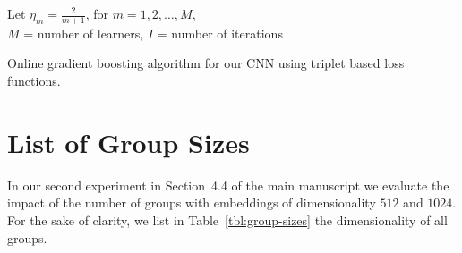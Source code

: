 \documentclass[10pt,journal,compsoc]{IEEEtran}
\begin{document}
\setlength{\algomargin}{0.0cm}\begin{algorithm}[htbp]
    Let $\eta_m = \frac{2}{m+1}$,  for $m = 1,2,\ldots,M$, \\
    $M$ = number of learners,
    $I$ = number of iterations \\
    
    \label{algo:triplets}
    \caption{Online gradient boosting algorithm for our \ac{CNN} using triplet based loss functions.}
\end{algorithm}\section{List of Group Sizes}\label{sec:embedding-sizes-groups}

In our second experiment in Section~4.4 of the main manuscript we evaluate the impact of the number of groups with 
embeddings of dimensionality $512$ and $1024$.
For the sake of clarity, we list in Table~\ref{tbl:group-sizes} the dimensionality of all groups.
\end{document}
